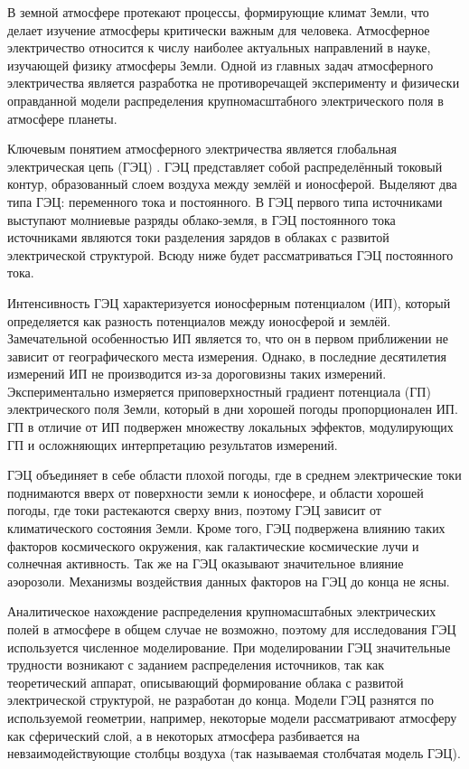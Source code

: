 
В земной атмосфере протекают процессы, формирующие климат Земли, что делает изучение атмосферы критически важным для человека. Атмосферное электричество относится к числу наиболее актуальных направлений в науке, изучающей физику атмосферы Земли. Одной из главных задач атмосферного электричества является разработка не противоречащей эксперименту и физически оправданной модели распределения крупномасштабного электрического поля в атмосфере планеты.

Ключевым понятием атмосферного электричества является глобальная электрическая цепь (ГЭЦ) \cite{Williams_Mareev_2014}. ГЭЦ представляет собой распределённый токовый контур, образованный слоем воздуха между землёй и ионосферой. Выделяют два типа ГЭЦ: переменного тока и постоянного. В ГЭЦ первого типа источниками выступают молниевые разряды облако-земля, в ГЭЦ постоянного тока источниками являются токи разделения зарядов в облаках с развитой электрической структурой. Всюду ниже будет рассматриваться ГЭЦ постоянного тока.

Интенсивность ГЭЦ характеризуется ионосферным потенциалом (ИП), который определяется как разность потенциалов между ионосферой и землёй. Замечательной особенностью ИП является то, что он в первом приближении не зависит от географического места измерения. Однако, в последние десятилетия измерений ИП не производится из-за дороговизны таких измерений. Экспериментально измеряется приповерхностный градиент потенциала (ГП) электрического поля Земли, который в дни хорошей погоды пропорционален ИП. ГП в отличие от ИП подвержен множеству локальных эффектов, модулирующих ГП и осложняющих интерпретацию результатов измерений.

ГЭЦ объединяет в себе области плохой погоды, где в среднем электрические токи поднимаются вверх от поверхности земли к ионосфере, и области хорошей погоды, где токи растекаются сверху вниз, поэтому ГЭЦ зависит от климатического состояния Земли. Кроме того, ГЭЦ подвержена влиянию таких факторов космического окружения, как галактические космические лучи и солнечная активность. Так же на ГЭЦ оказывают значительное влияние аэорозоли. Механизмы воздействия данных факторов на ГЭЦ до конца не ясны.%

Аналитическое нахождение распределения крупномасштабных электрических полей в атмосфере в общем случае не возможно, поэтому для исследования ГЭЦ используется численное моделирование. При моделировании ГЭЦ значительные трудности возникают с заданием распределения источников, так как теоретический аппарат, описывающий формирование облака с развитой электрической структурой, не разработан до конца. Модели ГЭЦ разнятся по используемой геометрии, например, некоторые модели рассматривают атмосферу как сферический слой, а в некоторых атмосфера разбивается на невзаимодействующие столбцы воздуха (так называемая столбчатая модель ГЭЦ).

